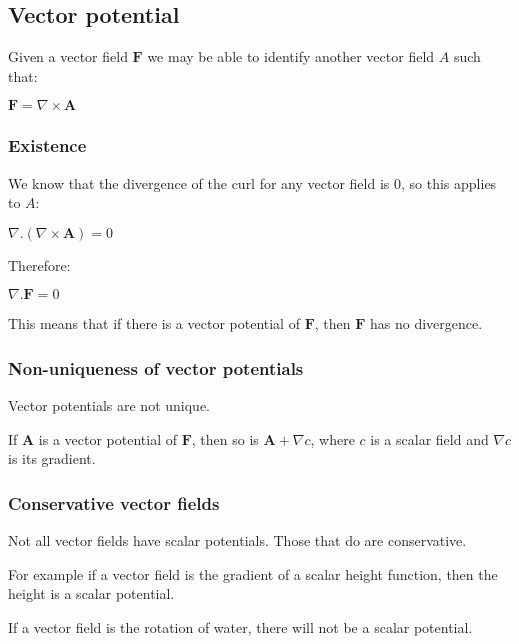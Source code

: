 
\subsection{Vector potential}

Given a vector field \(\mathbf F\) we may be able to identify another vector field \(A\) such that:

\(\mathbf F =\nabla \times \mathbf A\)

\subsubsection{Existence}

We know that the divergence of the curl for any vector field is \(0\), so this applies to \(A\):

\(\nabla . (\nabla \times \mathbf A)=0\)

Therefore:

\(\nabla . \mathbf F= 0\)

This means that if there is a vector potential of \(\mathbf F\), then \(\mathbf F\) has no divergence.

\subsubsection{Non-uniqueness of vector potentials}

Vector potentials are not unique.

If \(\mathbf A\) is a vector potential of \(\mathbf F\), then so is \(\mathbf A + \nabla c\), where \(c\) is a scalar field and \(\nabla c\) is its gradient.

\subsubsection{Conservative vector fields}

Not all vector fields have scalar potentials. Those that do are conservative.

For example if a vector field is the gradient of a scalar height function, then the height is a scalar potential.

If a vector field is the rotation of water, there will not be a scalar potential.

